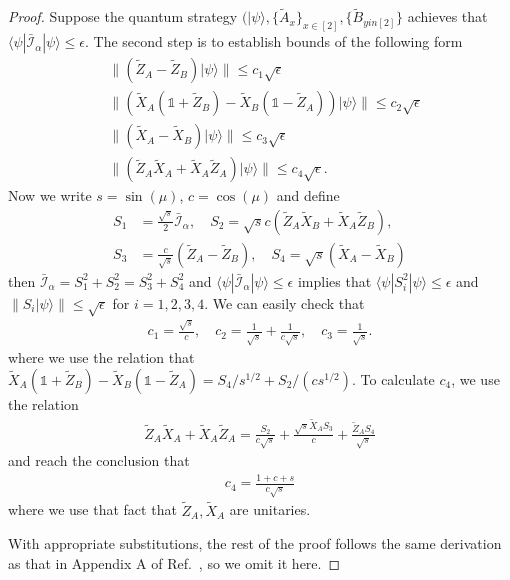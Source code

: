 \documentclass[11pt,letterpaper]{article}
\newcommand{\ket}[1]{|#1\rangle}
\newcommand{\bra}[1]{\langle#1|}
\newcommand{\1}{\mathbb{1}}
\newcommand{\LS}{LS}
\newcommand{\I}{\mathcal{I}}
\theoremstyle{definition}
\begin{document}
\begin{proof}
Suppose the quantum strategy $(\ket{\psi}, \{\tilde{A}_x\}_{x \in [2]}, \{\tilde{B}_{y in [2]}\}$ achieves that 
$\bra{\psi} \bar{\I}_\alpha \ket{\psi} \leq \epsilon$.
The second step is to establish bounds of the following form
\begin{align}
	&\|(\tilde{Z}_A-\tilde{Z}_B)\ket{\psi}\| \leq c_1 \sqrt{\epsilon}\\
	&\|(\tilde{X}_A(\1+\tilde{Z}_B)-\tilde{X}_B(\1-\tilde{Z}_A))\ket{\psi}\| \leq c_2 \sqrt{\epsilon}\\
	&\|(\tilde{X}_A-\tilde{X}_B)\ket{\psi}\| \leq c_3 \sqrt{\epsilon}\\
	&\|(\tilde{Z}_A\tilde{X}_A+\tilde{X}_A\tilde{Z}_A)\ket{\psi}\| \leq c_4 \sqrt{\epsilon}.
\end{align}
Now we write $s = \sin(\mu)$, $c = \cos(\mu)$ and define
\begin{align*}
	S_1 &= \frac{\sqrt{s}}{2} \bar{\I}_\alpha, \quad
	S_2 = \sqrt{s}c(\tilde{Z}_A\tilde{X}_B+\tilde{X}_A\tilde{Z}_B),\\
	S_3 &= \frac{c}{\sqrt{s}}(\tilde{Z}_A-\tilde{Z}_B),\quad
	S_4 = \sqrt{s}(\tilde{X}_A-\tilde{X}_B)
\end{align*}
then $\bar{\I}_\alpha = S_1^2 + S_2^2 = S_3^2 + S_4^2$ and $\bra{\psi}\bar{\I}_\alpha \ket{\psi} \leq \epsilon$ implies that 
$\bra{\psi}S^2_i \ket{\psi} \leq \epsilon$ and $\|S_i \ket{\psi} \| \leq \sqrt{\epsilon}$ for $i = 1,2,3,4$.
We can easily check that 
\begin{align*}
	c_1 = \frac{\sqrt{s}}{c}, \quad
	c_2 = \frac{1}{\sqrt{s}} + \frac{1}{c\sqrt{s}}, \quad
	c_3 = \frac{1}{\sqrt{s}}.
\end{align*}
where we use the relation that $\tilde{X}_A(\1+\tilde{Z}_B)-\tilde{X}_B(\1-\tilde{Z}_A) = S_4/s^{1/2} + S_2/(cs^{1/2})$.
To calculate $c_4$, we use the relation
\begin{align}
	\tilde{Z}_A\tilde{X}_A + \tilde{X}_A\tilde{Z}_A = \frac{S_2}{c\sqrt{s}} + \frac{\sqrt{s}\tilde{X}_AS_3}{c} + \frac{\tilde{Z}_AS_4}{\sqrt{s}}
\end{align}
and reach the conclusion that  
\begin{align}
	c_4 = \frac{1+c+s}{c\sqrt{s}}
\end{align}
where we use that fact that $\tilde{Z}_A, \tilde{X}_A$ are unitaries.

With appropriate substitutions, the rest of the proof follows the same derivation as that in Appendix A of Ref.~\cite{bamps2015},
so we omit it here.
\end{proof}
\end{document}
